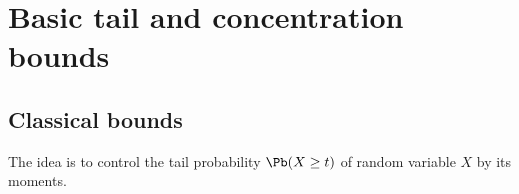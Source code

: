 \section{Basic tail and concentration bounds}

\subsection{Classical bounds}

The idea is to control the tail probability $\Pb(X\ge t)$ of random variable $X$ by its moments. 